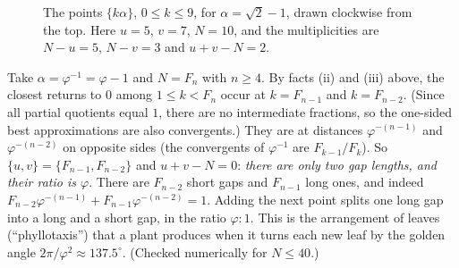 \begin{figure}[ht]
\centering
{}
\caption{The points $\{k\alpha\}$, $0\le k\le9$, for $\alpha=\sqrt2-1$, drawn clockwise from the top.
Here $u=5$, $v=7$, $N=10$, and the multiplicities are $N-u=5$, $N-v=3$ and $u+v-N=2$.}
\label{ERG:fig:threegap}
\end{figure}

\begin{example}\label{ERG:ex:fibgaps}
Take $\alpha=\varphi^{-1}=\varphi-1$ and $N=F_n$ with $n\ge4$. By facts (ii) and (iii) above, the
closest returns to $0$ among $1\le k<F_n$ occur at $k=F_{n-1}$ and $k=F_{n-2}$. (Since all partial
quotients equal $1$, there are no intermediate fractions, so the one-sided best approximations are also
convergents.) They are at distances
$\varphi^{-(n-1)}$ and $\varphi^{-(n-2)}$ on opposite sides (the convergents of $\varphi^{-1}$ are
$F_{k-1}/F_k$). So $\{u,v\}=\{F_{n-1},F_{n-2}\}$ and $u+v-N=0$: \emph{there are only two gap lengths,
and their ratio is $\varphi$}. There are $F_{n-2}$ short gaps and $F_{n-1}$ long ones, and indeed
$F_{n-2}\varphi^{-(n-1)}+F_{n-1}\varphi^{-(n-2)}=1$. Adding the next point splits one long gap into a
long and a short gap, in the ratio $\varphi:1$. This is the arrangement of leaves (``phyllotaxis'') that
a plant produces when it turns each new leaf by the golden angle $2\pi/\varphi^2\approx137.5^\circ$.
(Checked numerically for $N\le40$.)
\end{example}

